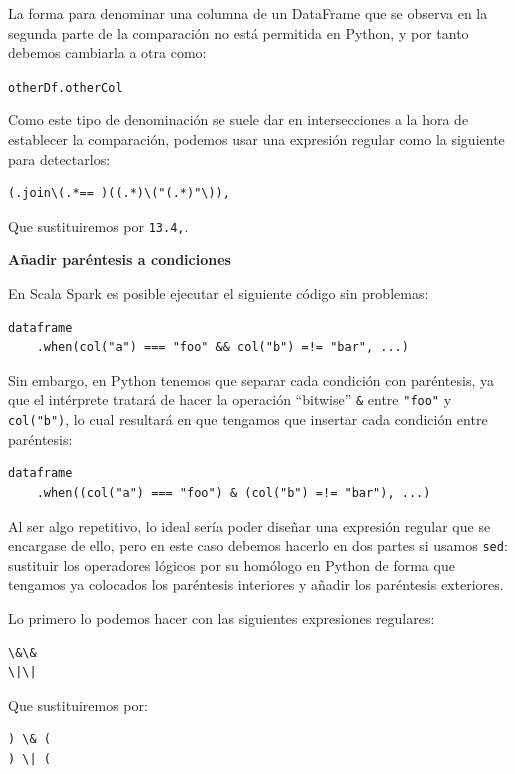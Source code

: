 \documentclass[12pt,twoside,titlepage]{report}
\newcommand{\quotes}[1]{``#1''}
\begin{document}
La forma para denominar una columna de un DataFrame que se observa en la segunda parte de la comparación no está permitida en Python, y por tanto debemos cambiarla a otra como:

\texttt{otherDf.otherCol}

Como este tipo de denominación se suele dar en intersecciones a la hora de establecer la comparación, podemos usar una expresión regular como la siguiente para detectarlos:

\begin{lstlisting}
(.join\(.*== )((.*)\("(.*)"\)),
\end{lstlisting}

Que sustituiremos por \texttt{13.4,}.

\textbf{Añadir paréntesis a condiciones}

En Scala Spark es posible ejecutar el siguiente código sin problemas:

\begin{lstlisting}
dataframe
	.when(col("a") === "foo" && col("b") =!= "bar", ...)
\end{lstlisting}

Sin embargo, en Python tenemos que separar cada condición con paréntesis, ya que el intérprete tratará de hacer la operación \quotes{bitwise} \texttt{\&} entre \texttt{"foo"} y \texttt{col("b")}, lo cual resultará en que tengamos que insertar cada condición entre paréntesis:

\begin{lstlisting}
dataframe
	.when((col("a") === "foo") & (col("b") =!= "bar"), ...)
\end{lstlisting}

Al ser algo repetitivo, lo ideal sería poder diseñar una expresión regular que se encargase de ello, pero en este caso debemos hacerlo en dos partes si usamos \texttt{sed}: sustituir los operadores lógicos por su homólogo en Python de forma que tengamos ya colocados los paréntesis interiores y añadir los paréntesis exteriores.

Lo primero lo podemos hacer con las siguientes expresiones regulares:

\begin{lstlisting}
\&\&
\|\|
\end{lstlisting}

Que sustituiremos por:

\begin{lstlisting}
) \& (
) \| (
\end{lstlisting}
\end{document}
